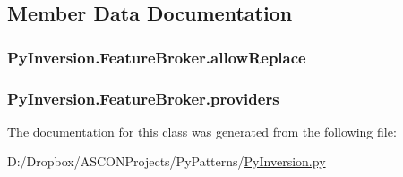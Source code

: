 \subsection{Member Data Documentation}
\hypertarget{class_py_inversion_1_1_feature_broker_a563bc54029c34054f768844c440aa5eb}{
\subsubsection[{allow\+Replace}]{\setlength{\rightskip}{0pt plus 5cm}Py\+Inversion.\+Feature\+Broker.\+allow\+Replace}}\label{class_py_inversion_1_1_feature_broker_a563bc54029c34054f768844c440aa5eb}
\hypertarget{class_py_inversion_1_1_feature_broker_ab400ab32713a1a15bbf13f1cd901d9eb}{
\subsubsection[{providers}]{\setlength{\rightskip}{0pt plus 5cm}Py\+Inversion.\+Feature\+Broker.\+providers}}\label{class_py_inversion_1_1_feature_broker_ab400ab32713a1a15bbf13f1cd901d9eb}


The documentation for this class was generated from the following file\+:\begin{DoxyCompactItemize}
\item 
D\+:/\+Dropbox/\+A\+S\+C\+O\+N\+Projects/\+Py\+Patterns/\hyperlink{_py_inversion_8py}{Py\+Inversion.\+py}\end{DoxyCompactItemize}
